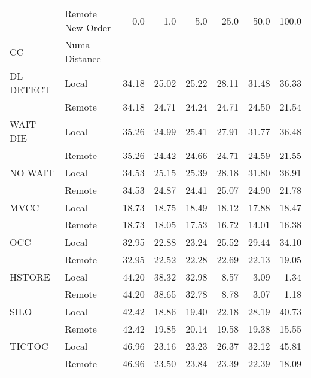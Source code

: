 \begin{tabular}{llrrrrrr}
\toprule
       & Remote New-Order &  0.0   &  1.0   &  5.0   &  25.0  &  50.0  &  100.0 \\
CC & Numa Distance &        &        &        &        &        &        \\
\midrule
DL DETECT & Local &  34.18 &  25.02 &  25.22 &  28.11 &  31.48 &  36.33 \\
       & Remote &  34.18 &  24.71 &  24.24 &  24.71 &  24.50 &  21.54 \\
WAIT DIE & Local &  35.26 &  24.99 &  25.41 &  27.91 &  31.77 &  36.48 \\
       & Remote &  35.26 &  24.42 &  24.66 &  24.71 &  24.59 &  21.55 \\
NO WAIT & Local &  34.53 &  25.15 &  25.39 &  28.18 &  31.80 &  36.91 \\
       & Remote &  34.53 &  24.87 &  24.41 &  25.07 &  24.90 &  21.78 \\
MVCC & Local &  18.73 &  18.75 &  18.49 &  18.12 &  17.88 &  18.47 \\
       & Remote &  18.73 &  18.05 &  17.53 &  16.72 &  14.01 &  16.38 \\
OCC & Local &  32.95 &  22.88 &  23.24 &  25.52 &  29.44 &  34.10 \\
       & Remote &  32.95 &  22.52 &  22.28 &  22.69 &  22.13 &  19.05 \\
HSTORE & Local &  44.20 &  38.32 &  32.98 &   8.57 &   3.09 &   1.34 \\
       & Remote &  44.20 &  38.65 &  32.78 &   8.78 &   3.07 &   1.18 \\
SILO & Local &  42.42 &  18.86 &  19.40 &  22.18 &  28.19 &  40.73 \\
       & Remote &  42.42 &  19.85 &  20.14 &  19.58 &  19.38 &  15.55 \\
TICTOC & Local &  46.96 &  23.16 &  23.23 &  26.37 &  32.12 &  45.81 \\
       & Remote &  46.96 &  23.50 &  23.84 &  23.39 &  22.39 &  18.09 \\
\bottomrule
\end{tabular}
